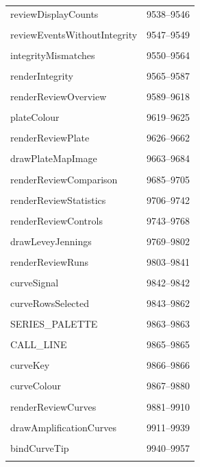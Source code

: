 {\begin{longtable}{@{}p{11cm}r@{}}
reviewDisplayCounts & 9538--9546 \\\\\hline
reviewEventsWithoutIntegrity & 9547--9549 \\\\\hline
integrityMismatches & 9550--9564 \\\\\hline
renderIntegrity & 9565--9587 \\\\\hline
renderReviewOverview & 9589--9618 \\\\\hline
plateColour & 9619--9625 \\\\\hline
renderReviewPlate & 9626--9662 \\\\\hline
drawPlateMapImage & 9663--9684 \\\\\hline
renderReviewComparison & 9685--9705 \\\\\hline
renderReviewStatistics & 9706--9742 \\\\\hline
renderReviewControls & 9743--9768 \\\\\hline
drawLeveyJennings & 9769--9802 \\\\\hline
renderReviewRuns & 9803--9841 \\\\\hline
curveSignal & 9842--9842 \\\\\hline
curveRowsSelected & 9843--9862 \\\\\hline
SERIES\_PALETTE & 9863--9863 \\\\\hline
CALL\_LINE & 9865--9865 \\\\\hline
curveKey & 9866--9866 \\\\\hline
curveColour & 9867--9880 \\\\\hline
renderReviewCurves & 9881--9910 \\\\\hline
drawAmplificationCurves & 9911--9939 \\\\\hline
bindCurveTip & 9940--9957 \\\\\hline

\end{longtable}}
